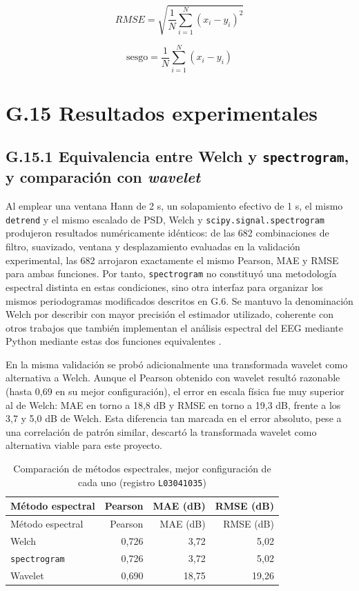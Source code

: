 \documentclass[
  spanish,
  a4paper,
  12pt,
  twoside]{memoir}
\begin{document}
\[RMSE = \sqrt{\frac{1}{N}\sum_{i=1}^{N} (x_i - y_i)^2}\]

\[\text{sesgo} = \frac{1}{N}\sum_{i=1}^{N} (x_i - y_i)\]

\chapter{G.15 Resultados
experimentales}\label{g.15-resultados-experimentales}

\section{\texorpdfstring{G.15.1 Equivalencia entre Welch y
\texttt{spectrogram}, y comparación con
\emph{wavelet}}{G.15.1 Equivalencia entre Welch y spectrogram, y comparación con wavelet}}\label{g.15.1-equivalencia-entre-welch-y-spectrogram-y-comparaciuxf3n-con-wavelet}

Al emplear una ventana Hann de 2 s, un solapamiento efectivo de 1 s, el
mismo \texttt{detrend} y el mismo escalado de PSD, Welch y
\texttt{scipy.signal.spectrogram} produjeron resultados numéricamente
idénticos: de las 682 combinaciones de filtro, suavizado, ventana y
desplazamiento evaluadas en la validación experimental, las 682
arrojaron exactamente el mismo Pearson, MAE y RMSE para ambas funciones.
Por tanto, \texttt{spectrogram} no constituyó una metodología espectral
distinta en estas condiciones, sino otra interfaz para organizar los
mismos periodogramas modificados descritos en G.6. Se mantuvo la
denominación Welch por describir con mayor precisión el estimador
utilizado, coherente con otros trabajos que también implementan el
análisis espectral del EEG mediante Python mediante estas dos funciones
equivalentes \citep{Sawa2022}.

En la misma validación se probó adicionalmente una transformada wavelet
como alternativa a Welch. Aunque el Pearson obtenido con wavelet resultó
razonable (hasta 0,69 en su mejor configuración), el error en escala
física fue muy superior al de Welch: MAE en torno a 18,8 dB y RMSE en
torno a 19,3 dB, frente a los 3,7 y 5,0 dB de Welch. Esta diferencia tan
marcada en el error absoluto, pese a una correlación de patrón similar,
descartó la transformada wavelet como alternativa viable para este
proyecto.

\begin{longtable}[]{@{}lrrr@{}}
\caption{Comparación de métodos espectrales, mejor configuración de cada
uno (registro
\protect\texttt{L03041035})}\label{tbl-metodos-espectrales}\tabularnewline
\toprule\noalign{}
Método espectral & Pearson & MAE (dB) & RMSE (dB) \\
\midrule\noalign{}
\endfirsthead
\toprule\noalign{}
Método espectral & Pearson & MAE (dB) & RMSE (dB) \\
\midrule\noalign{}
\endhead
\bottomrule\noalign{}
\endlastfoot
Welch & 0,726 & 3,72 & 5,02 \\
\texttt{spectrogram} & 0,726 & 3,72 & 5,02 \\
Wavelet & 0,690 & 18,75 & 19,26 \\
\end{longtable}
\end{document}
